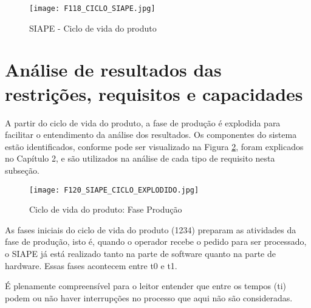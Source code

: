 					\begin{figure}[h]
						\centering
						\texttt{[image: F118\_CICLO\_SIAPE.jpg]} 
						\caption{SIAPE - Ciclo de vida do produto}
						\label{F118}
					\end{figure}
					
\section{Análise de resultados das  restrições, requisitos e capacidades}
		
A partir do ciclo de vida do produto, a fase de produção é explodida para facilitar o entendimento da análise dos resultados. Os componentes do sistema estão identificados, conforme pode ser visualizado na Figura \ref{F120}, foram explicados no Capítulo 2, e são utilizados na análise de cada tipo de requisito nesta subseção.  											
					
	
						\begin{figure}[h]
							\centering
							\texttt{[image: F120\_SIAPE\_CICLO\_EXPLODIDO.jpg]} 
							\caption{Ciclo de vida do produto: Fase Produção}
							\label{F120}
						\end{figure}
						
As fases iniciais do ciclo de vida do produto (1234) preparam as atividades da fase de produção, isto é, quando o operador recebe o pedido para ser processado, o SIAPE já está realizado tanto na parte de software quanto na parte de hardware. Essas fases acontecem entre t0 e t1. \par 

É plenamente compreensível para o leitor entender que entre os tempos (ti) podem ou não haver interrupções no processo que aqui não são consideradas.\par 

